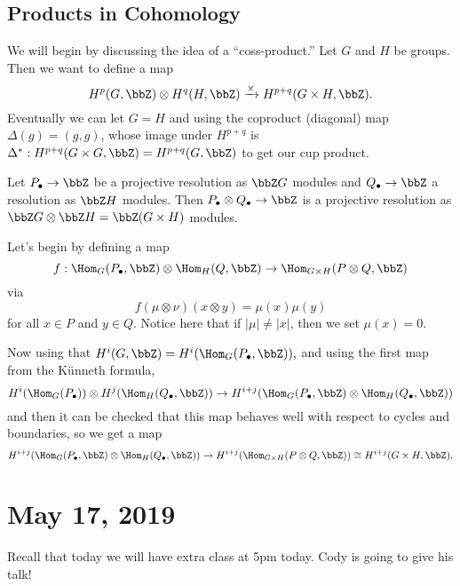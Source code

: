 \documentclass[12pt]{article}
\begin{document}
\subsection{Products in Cohomology}
We will begin by discussing the idea of a ``coss-product.'' Let $G$ and $H$ be groups. Then we want to define 
a map 
\[H^p(G,\bbZ)\otimes H^q(H,\bbZ)\xrightarrow{\times} H^{p+q}(G\times H,\bbZ).\]
Eventually we can let $G=H$ and using the coproduct (diagonal) map $\Delta(g)=(g,g)$, whose image under $H^{p+q}$ is 
$\Delta^\ast:H^{p+q}(G\times G,\bbZ)=H^{p+q}(G,\bbZ)$ to get our cup product.

\begin{prop}
	Let $P_\bullet\to\bbZ$ be a projective resolution as $\bbZ G$ modules and $Q_\bullet\to\bbZ$ a resolution as $\bbZ H$ modules.
	Then $P_\bullet\otimes Q_\bullet\to\bbZ$ is a projective resolution as $\bbZ G\otimes \bbZ H=\bbZ(G\times H)$ modules.
\end{prop}

Let's begin by defining a map
\[f:\Hom_G(P_\bullet,\bbZ)\otimes \Hom_H(Q,\bbZ)\to \Hom_{G\times H}(P\otimes Q,\bbZ)\]
via
\[f(\mu\otimes \nu)(x\otimes y)=\mu(x)\mu(y)\]
for all $x\in P$ and $y\in Q$. Notice here that if $|\mu|\ne |x|$, then we set $\mu(x)=0$.

Now using that $H^i(G,\bbZ)=H^i(\Hom_G(P_\bullet,\bbZ)),$ and using the first map from the K\"unneth formula,
\[H^i(\Hom_G(P_\bullet))\otimes H^j(\Hom_H(Q_\bullet,\bbZ))\to H^{i+j}(\Hom_G(P_\bullet,\bbZ)\otimes \Hom_H(Q_\bullet,\bbZ))\]
and then it can be checked that this map behaves well with respect to cycles and boundaries, so we 
get a map 
\[H^{i+j}(\Hom_G(P_\bullet,\bbZ)\otimes \Hom_H(Q_\bullet,\bbZ))\to H^{i+j}(\Hom_{G\times H}(P\otimes Q,\bbZ))\cong H^{i+j}(G\times H,\bbZ).\]

\section{May 17, 2019}
Recall that today we will have extra class at 5pm today. Cody is going to give his talk!
\end{document}
